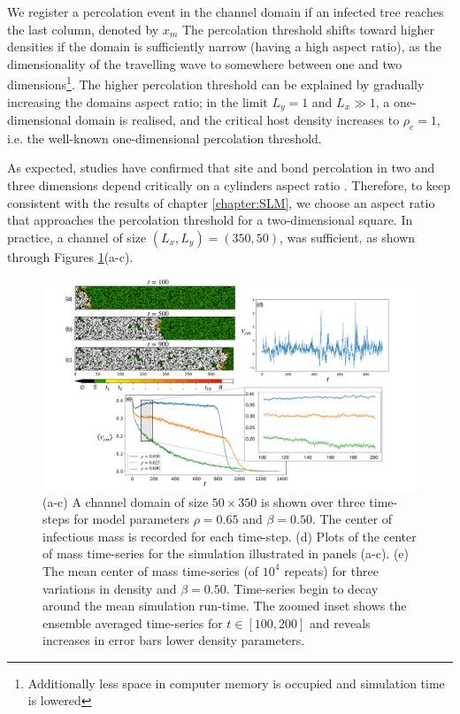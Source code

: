 We register a percolation event in the channel domain if an infected tree reaches the last column, denoted by $x_m$
The percolation threshold shifts toward higher densities if the domain is sufficiently narrow (having a high aspect ratio), as the dimensionality of the travelling wave to somewhere between one and two dimensions\footnote{Additionally less space in computer memory is occupied and simulation time is lowered}. 
The higher percolation threshold can be explained by gradually increasing the domains aspect ratio;
in the limit $L_y = 1$ and $L_x  \gg 1$, a one-dimensional domain is realised, and the critical host density increases to $\rho_c=1$, i.e. the well-known one-dimensional percolation threshold.

As expected, studies have confirmed that site and bond percolation in two and three dimensions depend critically on a cylinders aspect ratio \cite{sangare2009continuum, munson1991estimation}.
Therefore, to keep consistent with the results of chapter \ref{chapter:SLM}, we choose an aspect ratio that approaches the percolation threshold for a two-dimensional square. In practice, a channel of size $(L_x, L_y) = (350, 50)$, was sufficient, as shown through Figures \ref{fig:ews-primer}(a-c). 

\newpage

\begin{figure}
    \centering
    \includegraphics[scale=0.30]{chapter4/figures/figure1-channel-domain.pdf}
    \caption{
    (a-c) A channel domain of size $50\times350$ is shown over three time-steps for model parameters $\rho=0.65$ and $\beta=0.50$. 
    The center of infectious mass is recorded for each time-step. 
    (d) Plots of the center of mass time-series for the simulation illustrated in panels (a-c). 
    (e) The mean center of mass time-series (of $10^4$ repeats) for three variations in density and $\beta=0.50$. 
    Time-series begin to decay around the mean simulation run-time.  
    The zoomed inset shows the ensemble averaged time-series for $t\in[100, 200]$ and reveals increases in error bars lower density parameters.
    }
    \label{fig:ews-primer}
\end{figure}

